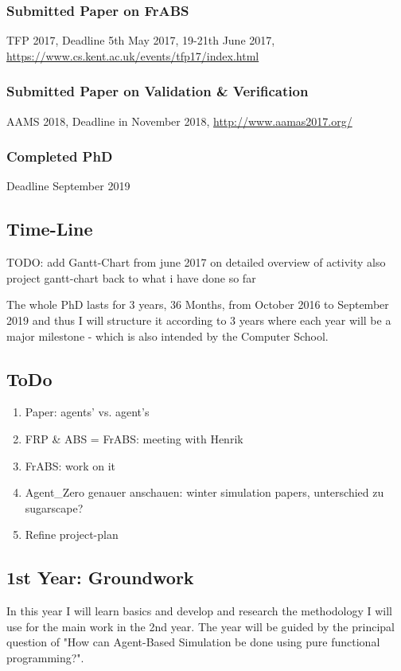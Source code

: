 \subsubsection*{Submitted Paper on FrABS}
TFP 2017, Deadline 5th May 2017, 19-21th June 2017, \url{https://www.cs.kent.ac.uk/events/tfp17/index.html}

\subsubsection*{Submitted Paper on Validation \& Verification}
AAMS 2018, Deadline in November 2018, \url{http://www.aamas2017.org/}

\subsubsection*{Completed PhD}
Deadline September 2019


\subsection{Time-Line}
TODO: add Gantt-Chart
from june 2017 on detailed overview of activity
also project gantt-chart back to what i have done so far

The whole PhD lasts for 3 years, 36 Months, from October 2016 to September 2019 and thus I will structure it according to 3 years where each year will be a major milestone - which is also intended by the Computer School.

\subsection{ToDo}
\begin{enumerate}
	\item Paper: agents' vs. agent's
	\item FRP \& ABS = FrABS: meeting with Henrik
	\item FrABS: work on it
	\item Agent\_Zero genauer anschauen: winter simulation papers, unterschied zu sugarscape?
	\item Refine project-plan 
\end{enumerate}




\subsection{1st Year: Groundwork}
In this year I will learn basics and develop and research the methodology I will use for the main work in the 2nd year. The year will be guided by the principal question of "How can Agent-Based Simulation be done using pure functional programming?".

